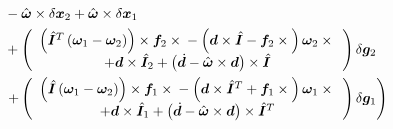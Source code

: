 \documentclass[10pt,dvips,fleqn,subeqn]{report}
\newcommand{\T}[1]{\bm{#1}}
\newcommand{\TT}[1]{\bm{#1}}
\begin{document}
\begin{align}
	& \quad\quad\quad
		- \hat{\T{\omega}}\times\delta\T{x}_2
		+ \hat{\T{\omega}}\times\delta\T{x}_1
	\nonumber \\
	& \quad\quad\quad
		+ \plbr{\cvvect{
			\plbr{
				\hat{\TT{I}}^T \plbr{
					\T{\omega}_1
					- \T{\omega}_2
				}
			} \times \T{f}_2\times{}
			- \plbr{
				\T{d}\times\hat{\TT{I}}
				- \T{f}_2\times{}
			} \T{\omega}_2\times{} \\
			+ \T{d}\times\hat{\TT{I}}_2
			+ \plbr{
				\dot{\T{d}}
				- \hat{\T{\omega}}\times\T{d}
			}\times\hat{\TT{I}}
		}} \delta\T{g}_2
	\nonumber \\
	& \quad\quad\quad
	\rplbr{
		+ \plbr{\cvvect{
			\plbr{
				\hat{\TT{I}} \plbr{
					\T{\omega}_1
					- \T{\omega}_2
				}
			} \times \T{f}_1\times{}
			- \plbr{
				\T{d}\times\hat{\TT{I}}^T
				+ \T{f}_1\times{}
			}\T{\omega}_1\times{} \\
			+ \T{d}\times\hat{\TT{I}}_1
			+ \plbr{
				\dot{\T{d}}
				- \hat{\T{\omega}}\times\T{d}
			}\times\hat{\TT{I}}^T
		}} \delta\T{g}_1
	}
\end{align}

\end{document}

